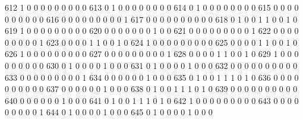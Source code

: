 \documentclass[compress,8pt]{beamer}
\begin{document}
\begin{frame}
\begin{Schunk}
  612      1       0   0              0        0    0       0       0   0   0
  613      0       1   0              0        0    0       0       0   0   0
  614      0       1   0              0        0    0       0       0   0   0
  615      0       0   0              0        0    0       0       0   0   0
  616      0       0   0              0        0    0       0       0   0   1
  617      0       0   0              0        0    0       0       0   0   0
  618      0       1   0              0        1    1       0       0   1   0
  619      1       0   0              0        0    0       0       0   0   0
  620      0       0   0              0        0    0       0       1   0   0
  621      0       0   0              0        0    0       0       0   0   1
  622      0       0   0              0        0    0       0       0   0   1
  623      0       0   0              0        1    1       0       0   1   0
  624      1       0   0              0        0    0       0       0   0   0
  625      0       0   0              0        1    1       0       0   1   0
  626      1       0   0              0        0    0       0       0   0   0
  627      0       0   0              0        0    0       0       0   0   1
  628      0       0   0              0        1    1       0       0   1   0
  629      1       0   0              0        0    0       0       0   0   0
  630      0       1   0              0        0    0       1       0   0   0
  631      0       1   0              0        0    0       1       0   0   0
  632      0       0   0              0        0    0       0       0   0   0
  633      0       0   0              0        0    0       0       0   0   1
  634      0       0   0              0        0    0       1       0   0   0
  635      0       1   0              0        1    1       1       0   1   0
  636      0       0   0              0        0    0       0       0   0   0
  637      0       0   0              0        0    0       1       0   0   0
  638      0       1   0              0        1    1       1       0   1   0
  639      0       0   0              0        0    0       0       0   0   0
  640      0       0   0              0        0    0       1       0   0   0
  641      0       1   0              0        1    1       1       0   1   0
  642      1       0   0              0        0    0       0       0   0   0
  643      0       0   0              0        0    0       0       0   0   1
  644      0       1   0              0        0    0       1       0   0   0
  645      0       1   0              0        0    0       1       0   0   0

\end{Schunk}
\end{frame}
\end{document}
